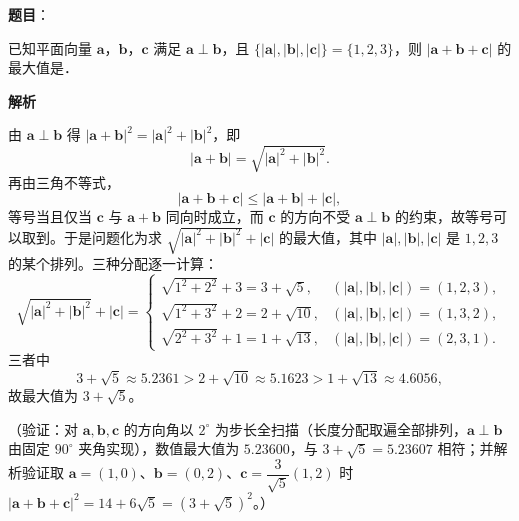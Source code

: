 \begin{answer}

\textbf{题目}：

已知平面向量 \(\boldsymbol{a}\)，\(\boldsymbol{b}\)，\(\boldsymbol{c}\) 满足 \(\boldsymbol{a}\perp\boldsymbol{b}\)，且 \(\{|\boldsymbol{a}|,|\boldsymbol{b}|,|\boldsymbol{c}|\}=\{1,2,3\}\)，则 \(|\boldsymbol{a}+\boldsymbol{b}+\boldsymbol{c}|\) 的最大值是\gkblank{}．

\textbf{解析}

由 \(\boldsymbol{a}\perp\boldsymbol{b}\) 得 \(|\boldsymbol{a}+\boldsymbol{b}|^{2}=|\boldsymbol{a}|^{2}+|\boldsymbol{b}|^{2}\)，即
\nopagebreak[4]
\[
|\boldsymbol{a}+\boldsymbol{b}|=\sqrt{|\boldsymbol{a}|^{2}+|\boldsymbol{b}|^{2}}.
\]
再由三角不等式，
\nopagebreak[4]
\[
|\boldsymbol{a}+\boldsymbol{b}+\boldsymbol{c}|\leqslant|\boldsymbol{a}+\boldsymbol{b}|+|\boldsymbol{c}|,
\]
等号当且仅当 \(\boldsymbol{c}\) 与 \(\boldsymbol{a}+\boldsymbol{b}\) 同向时成立，而 \(\boldsymbol{c}\) 的方向不受 \(\boldsymbol{a}\perp\boldsymbol{b}\) 的约束，故等号可以取到。于是问题化为求 \(\sqrt{|\boldsymbol{a}|^{2}+|\boldsymbol{b}|^{2}}+|\boldsymbol{c}|\) 的最大值，其中 \(|\boldsymbol{a}|,|\boldsymbol{b}|,|\boldsymbol{c}|\) 是 \(1,2,3\) 的某个排列。三种分配逐一计算：
\nopagebreak[4]
\[
\sqrt{|\boldsymbol{a}|^{2}+|\boldsymbol{b}|^{2}}+|\boldsymbol{c}|=
\begin{cases}
\sqrt{1^{2}+2^{2}}+3=3+\sqrt{5}, & (|\boldsymbol{a}|,|\boldsymbol{b}|,|\boldsymbol{c}|)=(1,2,3),\\
\sqrt{1^{2}+3^{2}}+2=2+\sqrt{10}, & (|\boldsymbol{a}|,|\boldsymbol{b}|,|\boldsymbol{c}|)=(1,3,2),\\
\sqrt{2^{2}+3^{2}}+1=1+\sqrt{13}, & (|\boldsymbol{a}|,|\boldsymbol{b}|,|\boldsymbol{c}|)=(2,3,1).
\end{cases}
\]
三者中
\nopagebreak[4]
\[
3+\sqrt{5}\approx5.2361>2+\sqrt{10}\approx5.1623>1+\sqrt{13}\approx4.6056,
\]
故最大值为 \(3+\sqrt{5}\)。

（验证：对 \(\boldsymbol{a},\boldsymbol{b},\boldsymbol{c}\) 的方向角以 \(2^{\circ}\) 为步长全扫描（长度分配取遍全部排列，\(\boldsymbol{a}\perp\boldsymbol{b}\) 由固定 \(90^{\circ}\) 夹角实现），数值最大值为 \(5.23600\)，与 \(3+\sqrt{5}=5.23607\) 相符；并解析验证取 \(\boldsymbol{a}=(1,0)\)、\(\boldsymbol{b}=(0,2)\)、\(\boldsymbol{c}=\dfrac{3}{\sqrt{5}}(1,2)\) 时 \(|\boldsymbol{a}+\boldsymbol{b}+\boldsymbol{c}|^{2}=14+6\sqrt{5}=(3+\sqrt{5})^{2}\)。）


\end{answer}
